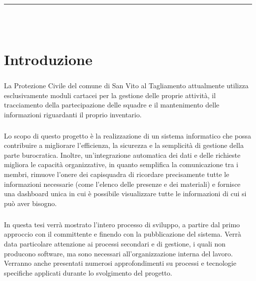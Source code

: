 \documentclass[12pt,a4paper,twoside,english,italian]{book}
\DeclareRobustCommand{\univsc}[1]{\LARGE\textsc{\textls[75]{#1}}}
\begin{document}
\begin{titlepage}
\begin{center}
\begin{tabular*}{\textwidth}{@{}l@{\extracolsep{\fill}}r@{}}
		\end{tabular*}
		
	\end{center}
	
	\begin{center}
		\vfill
		\rule{10cm}{.4pt}\\
		\medskip
		\univsc{Anno Accademico 2020-21}\\  %
	\end{center}	
	
\end{titlepage}



\tableofcontents

\mainmatter
{}

\chapter{Introduzione}

\paragraph{} La Protezione Civile del comune di San Vito al Tagliamento \cite{protezionecivile} attualmente utilizza esclusivamente moduli cartacei per la gestione delle proprie attività, il tracciamento della partecipazione delle squadre e il mantenimento delle informazioni riguardanti il proprio inventario. 

\paragraph{} Lo scopo di questo progetto è la realizzazione di un sistema informatico che possa contribuire a migliorare l'efficienza, la sicurezza e la semplicità di gestione della parte burocratica. Inoltre, un'integrazione automatica dei dati e delle richieste migliora le capacità organizzative, in quanto semplifica la comunicazione tra i membri, rimuove l'onere dei capisquadra di ricordare precisamente tutte le informazioni necessarie (come l'elenco delle presenze e dei materiali) e fornisce una dashboard unica in cui è possibile visualizzare tutte le informazioni di cui si può aver bisogno. 

\paragraph{} In questa tesi verrà mostrato l'intero processo di sviluppo, a partire dal primo approccio con il committente e finendo con la pubblicazione del sistema. Verrà data particolare attenzione ai processi secondari e di gestione, i quali non producono software, ma sono necessari all'organizzazione interna del lavoro. Verranno anche presentati numerosi approfondimenti su processi e tecnologie specifiche applicati durante lo svolgimento del progetto. 
\end{document}
